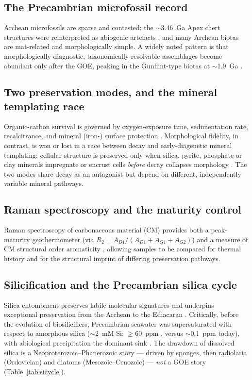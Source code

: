 \documentclass[11pt]{article}
\begin{document}
\subsection{The Precambrian microfossil record}
Archean microfossils are sparse and contested: the $\sim$3.46~Ga Apex chert structures
\citep{Schopf1993} were reinterpreted as abiogenic artefacts \citep{Brasier2002}, and many Archean
biotas are mat-related and morphologically simple. A widely noted pattern is that morphologically
diagnostic, taxonomically resolvable assemblages become abundant only after the GOE, peaking in the
Gunflint-type biotas at $\sim$1.9~Ga \citep{Javaux2018,Wacey2014}.

\subsection{Two preservation modes, and the mineral templating race}
Organic-carbon survival is governed by oxygen-exposure time, sedimentation rate, recalcitrance, and
mineral (iron-) surface protection \citep{Canfield1994,Hedges1995,Hartnett1998,Lalonde2012}.
Morphological fidelity, in contrast, is won or lost in a race between decay and early-diagenetic
mineral templating: cellular structure is preserved only when silica, pyrite, phosphate or clay
minerals impregnate or encrust cells \emph{before} decay collapses morphology \citep{Wacey2012}.
The two modes share decay as an antagonist but depend on different, independently variable mineral
pathways.

\subsection{Raman spectroscopy and the maturity control}
Raman spectroscopy of carbonaceous material (CM) provides both a peak-maturity geothermometer
\citep{Beyssac2002} (via $R_2=A_{D1}/(A_{D1}+A_{G1}+A_{G2})$) and a measure of CM structural order
aromaticity \citep{Qu2019}, allowing samples to be compared for thermal history and for the
structural imprint of differing preservation pathways.

\subsection{Silicification and the Precambrian silica cycle}
Silica entombment preserves labile molecular signatures \citep{Alleon2016silica} and underpins
exceptional preservation from the Archean to the Ediacaran \citep{Tarhan}. Critically, before the
evolution of biosilicifiers, Precambrian seawater was supersaturated with respect to amorphous
silica ($\sim$2~mM Si; $\geq$60~ppm , versus $\sim$0.1~ppm today), with abiological
precipitation the dominant sink \citep{Siever1992,Perry2003}. The drawdown of dissolved silica is a
Neoproterozoic--Phanerozoic story --- driven by sponges, then radiolaria (Ordovician) and diatoms
(Mesozoic--Cenozoic) --- \emph{not} a GOE story (Table~\ref{tab:sicycle}).
\end{document}
